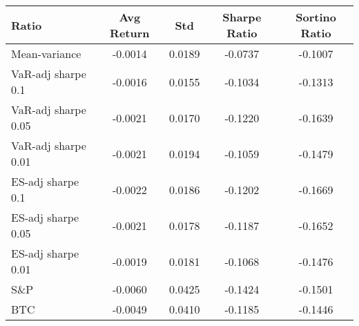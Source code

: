 \begin{tabular}{lcccc}
\toprule
Ratio & Avg Return & Std & Sharpe Ratio & Sortino Ratio\\
\midrule
Mean-variance & -0.0014 & 0.0189 & -0.0737 & -0.1007\\
VaR-adj sharpe 0.1 & -0.0016 & 0.0155 & -0.1034 & -0.1313\\
VaR-adj sharpe 0.05 & -0.0021 & 0.0170 & -0.1220 & -0.1639\\
VaR-adj sharpe 0.01 & -0.0021 & 0.0194 & -0.1059 & -0.1479\\
ES-adj sharpe 0.1 & -0.0022 & 0.0186 & -0.1202 & -0.1669\\
ES-adj sharpe 0.05 & -0.0021 & 0.0178 & -0.1187 & -0.1652\\
ES-adj sharpe 0.01 & -0.0019 & 0.0181 & -0.1068 & -0.1476\\
S\&P & -0.0060 & 0.0425 & -0.1424 & -0.1501\\
BTC & -0.0049 & 0.0410 & -0.1185 & -0.1446\\
\bottomrule
\end{tabular}
